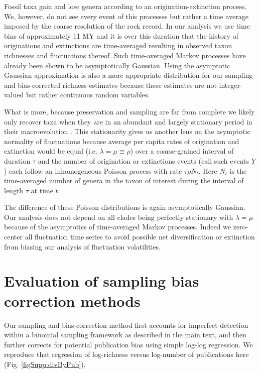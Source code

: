 \documentclass[12pt]{article}
\let\citep=\cite
\begin{document}
Fossil taxa gain and lose genera according to an
origination-extinction process. We, however, do not see every event of
this processes but rather a time average imposed by the coarse
resolution of the rock record. In our analysis we use time bins of
approximately 11 MY and it is over this duration that the history of
originations and extinctions are time-averaged resulting in observed
taxon richnesses and fluctuations thereof. Such time-averaged Markov
processes have already been shown to be asymptotically
Gaussian\citep{grassmann1987}.  Using the asymptotic Gaussian
approximation is also a more appropriate distribution for our sampling
and bias-corrected richness estimates because these estimates are not
integer-valued but rather continuous random variables.


What is more, because preservation and sampling are far from complete
we likely only recover taxa when they are in an abundant and largely
stationary period in their macroevolution \citep{liow2007}. This
stationarity gives us another lens on the asymptotic normality of
fluctuations because average per capita rates of origination and
extinction would be equal (i.e.  $\lambda = \mu \equiv \rho$) over a
coarse-grained interval of duration $\tau$ and the number of
origination or extinctions events (call such events $Y$) each follow
an inhomogeneous Poisson process with rate $\tau \rho N_t$. Here $N_t$
is the time-averaged number of genera in the taxon of interest during
the interval of length $\tau$ at time $t$.

The difference of these Poisson distributions is again asymptotically
Gaussian.  Our analysis does not depend on all clades being perfectly
stationary with $\lambda = \mu$ because of the asymptotics of
time-averaged Markov processes. Indeed we zero-center all fluctuation
time series to avoid possible net diversification or extinction from
biasing our analysis of fluctuation volatilities.


\section{Evaluation of sampling bias correction methods}
\label{sec:suppBiasEval}

Our sampling and bias-correction method first accounts for imperfect
detection within a binomial sampling framework as described in the
main text, and then further corrects for potential publication bias
using simple log-log regression.  We reproduce that regression of
log-richness versus log-number of publications here
(Fig. \ref{figSupp:divByPub}). 
\end{document}

